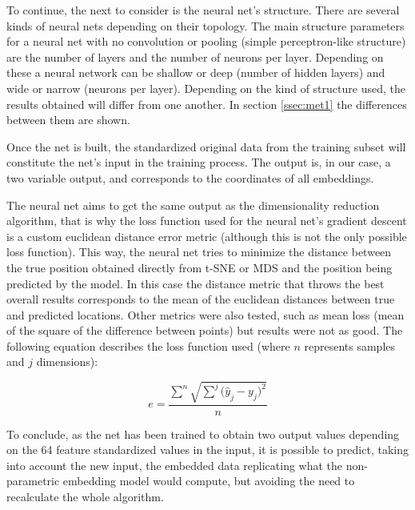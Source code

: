 \documentclass[a4paper,11pt,spanish]{report}
\begin{document}
To continue, the next to consider is the neural net's structure. There are several kinds of neural nets depending on their topology. The main structure parameters for a neural net with no convolution or pooling (simple perceptron-like structure) are the number of layers and the number of neurons per layer. Depending on these a neural network can be shallow or deep (number of hidden layers) and wide or narrow (neurons per layer). Depending on the kind of structure used, the results obtained will differ from one another. In section \ref{ssec:met1} the differences between them are shown.

Once the net is built, the standardized original data from the training subset will constitute the net's input in the training process. The output is, in our case, a two variable output, and corresponds to the coordinates of all embeddings. 

The neural net aims to get the same output as the dimensionality reduction algorithm, that is why the loss function used for the neural net's gradient descent is a custom euclidean distance error metric (although this is not the only possible loss function). This way, the neural net tries to minimize the distance between the true position obtained directly from t-SNE or MDS and the position being predicted by the model. In this case the distance metric that throws the best overall results corresponds to the mean of the euclidean distances between true and predicted locations. Other metrics were also tested, such as mean loss (mean of the square of the difference between points) but results were not as good. The following equation describes the loss function used (where $n$ represents samples and $j$ dimensions):

$$ e = \frac{\sum^{n}{\sqrt{\sum^j{{(\hat{y}}}_{j} - y_{j})^{2}}}}{n} $$

To conclude, as the net has been trained to obtain two output values depending on the 64 feature standardized values in the input, it is possible to predict, taking into account the new input, the embedded data replicating what the non-parametric embedding model would compute, but avoiding the need to recalculate the whole algorithm.
\end{document}
